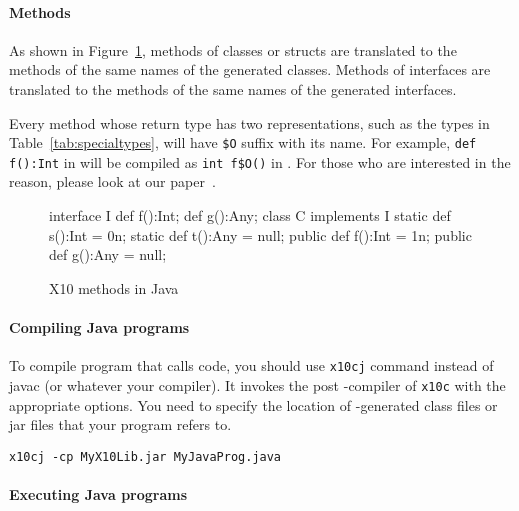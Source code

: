 \paragraph{Methods}

As shown in Figure~\ref{fig:methods}, methods of \Xten{} classes or structs are translated to the methods of the same names of the generated \Java{} classes.
Methods of \Xten{} interfaces are translated to the methods of the same names of the generated \Java{} interfaces.

Every method whose return type has two representations, such as the types in Table~\ref{tab:specialtypes}, will have \verb|$O| suffix with its name.
For example, \verb|def f():Int| in \Xten{} will be compiled as \verb|int f$O()| in \Java{}.
For those who are interested in the reason, please look at our paper~\cite{TakeuchiX1012}.

\begin{figure}
\begin{xten}
interface I {
  def f():Int;
  def g():Any;
}
class C implements I {
  static def s():Int = 0n;
  static def t():Any = null;
  public def f():Int = 1n;
  public def g():Any = null;
}
\end{xten}
\caption{X10 methods in Java}
\label{fig:methods}
\end{figure}


\paragraph{Compiling Java programs}

To compile \Java{} program that calls \Xten{} code, you should use
\verb|x10cj| command instead of javac (or whatever your \Java{}
compiler). It invokes the post \Java{}-compiler of \verb|x10c| with the
appropriate options. You need to specify the location of \Xten{}-generated
class files or jar files that your \Java{} program refers to.

\verb|x10cj -cp MyX10Lib.jar MyJavaProg.java|


\paragraph{Executing Java programs}

